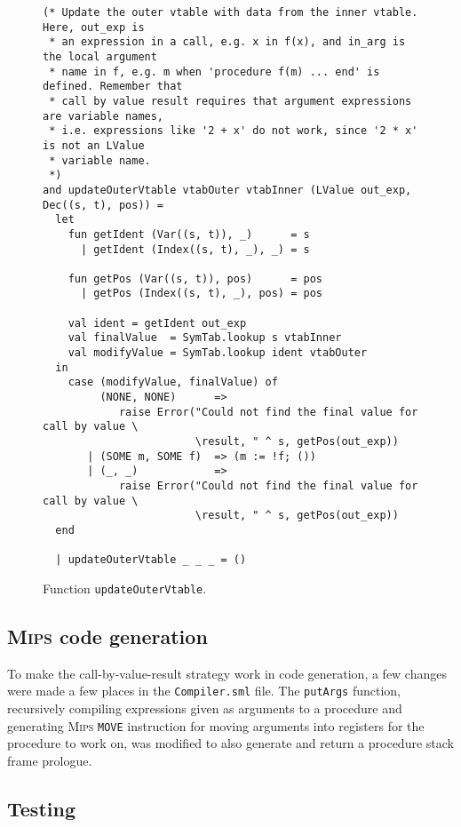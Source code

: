 \begin{figure}[H]
  \begin{lstlisting}[style=MLStyle]
(* Update the outer vtable with data from the inner vtable. Here, out_exp is
 * an expression in a call, e.g. x in f(x), and in_arg is the local argument
 * name in f, e.g. m when 'procedure f(m) ... end' is defined. Remember that
 * call by value result requires that argument expressions are variable names,
 * i.e. expressions like '2 + x' do not work, since '2 * x' is not an LValue
 * variable name.
 *)
and updateOuterVtable vtabOuter vtabInner (LValue out_exp, Dec((s, t), pos)) = 
  let
    fun getIdent (Var((s, t)), _)      = s
      | getIdent (Index((s, t), _), _) = s
    
    fun getPos (Var((s, t)), pos)      = pos
      | getPos (Index((s, t), _), pos) = pos

    val ident = getIdent out_exp
    val finalValue  = SymTab.lookup s vtabInner
    val modifyValue = SymTab.lookup ident vtabOuter
  in
    case (modifyValue, finalValue) of
         (NONE, NONE)      =>
            raise Error("Could not find the final value for call by value \
                        \result, " ^ s, getPos(out_exp))
       | (SOME m, SOME f)  => (m := !f; ())
       | (_, _)            =>
            raise Error("Could not find the final value for call by value \
                        \result, " ^ s, getPos(out_exp))
  end

  | updateOuterVtable _ _ _ = ()
  \end{lstlisting}
  \caption{Function \texttt{updateOuterVtable}.}
  \label{fig_updateOuterVtable}
\end{figure}

\subsection{\textsc{Mips} code generation}
To make the call-by-value-result strategy work in code generation, a few changes
were made a few places in the \verb|Compiler.sml| file. The \verb|putArgs|
function, recursively compiling expressions given as arguments to a procedure
and generating \textsc{Mips} \verb|MOVE| instruction for moving arguments into
registers for the procedure to work on, was modified to also generate and return
a procedure stack frame prologue.



\subsection{Testing}
